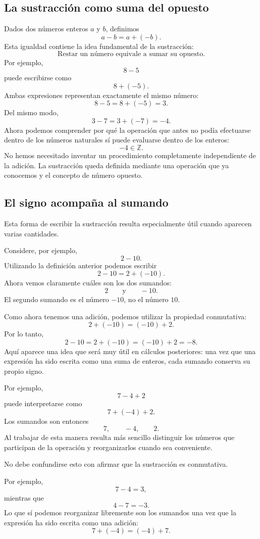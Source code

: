\subsection{La sustracción como suma del opuesto}

Dados dos números enteros \(a\) y \(b\), definimos
\[
a-b=a+(-b).
\]
Esta igualdad contiene la idea fundamental de la sustracción:
\[
\boxed{\text{Restar un número equivale a sumar su opuesto.}}
\]
Por ejemplo,
\[
8-5
\]
puede escribirse como
\[
8+(-5).
\]
Ambas expresiones representan exactamente el mismo número:
\[
8-5=8+(-5)=3.
\]
Del mismo modo,
\[
3-7=3+(-7)=-4.
\]
Ahora podemos comprender por qué la operación que antes no podía efectuarse dentro de los números naturales sí puede evaluarse dentro de los enteros:
\[
-4\in\mathbb{Z}.
\]
No hemos necesitado inventar un procedimiento completamente independiente de la adición. La sustracción queda definida mediante una operación que ya conocemos y el concepto de número opuesto.

\subsection{El signo acompaña al sumando}

Esta forma de escribir la sustracción resulta especialmente útil cuando aparecen varias cantidades.

Considere, por ejemplo,
\[
2-10.
\]
Utilizando la definición anterior podemos escribir
\[
2-10=2+(-10).
\]
Ahora vemos claramente cuáles son los dos sumandos:
\[
2
\qquad\text{y}\qquad
-10.
\]
El segundo sumando es el número \(-10\), no el número \(10\).

Como ahora tenemos una adición, podemos utilizar la propiedad conmutativa:
\[
2+(-10)=(-10)+2.
\]
Por lo tanto,
\[
2-10
=
2+(-10)
=
(-10)+2
=
-8.
\]
Aquí aparece una idea que será muy útil en cálculos posteriores: una vez que una expresión ha sido escrita como una suma de enteros, cada sumando conserva su propio signo.

Por ejemplo,
\[
7-4+2
\]
puede interpretarse como
\[
7+(-4)+2.
\]
Los sumandos son entonces
\[
7,\qquad -4,\qquad 2.
\]
Al trabajar de esta manera resulta más sencillo distinguir los números que participan de la operación y reorganizarlos cuando sea conveniente.

\begin{note}
No debe confundirse esto con afirmar que la sustracción es conmutativa.

Por ejemplo,
\[
7-4=3,
\]
mientras que
\[
4-7=-3.
\]
Lo que sí podemos reorganizar libremente son los sumandos una vez que la expresión ha sido escrita como una adición:
\[
7+(-4)=(-4)+7.
\]
\end{note}

